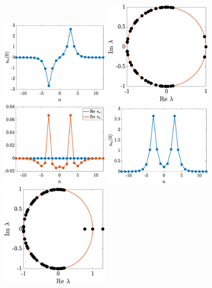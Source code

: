 \documentclass[12pt,reqno]{amsart}
\begin{document}
\begin{figure}
	\begin{center}
	\includegraphics[width=5.5cm]{doubleun0.eps} \hspace{-0.5cm}
	\includegraphics[width=5.5cm]{doublespec.eps} \hspace{-0.5cm}
	\includegraphics[width=5.5cm]{doubleinteig.eps} 
	\includegraphics[width=5.5cm]{doubleppun0.eps} \hspace{-0.5cm}
	\includegraphics[width=5.5cm]{doubleppspec.eps} \hspace{-0.5cm}

\end{center}
\end{figure}
\end{document}

